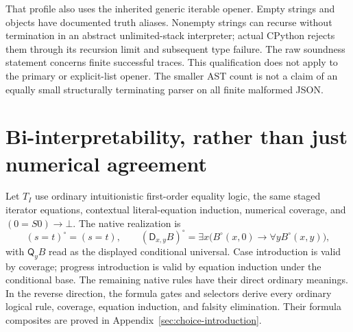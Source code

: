 \documentclass[11pt,letterpaper]{article}
\theoremstyle{definition}\newtheorem{definition}[theorem]{Definition}
\theoremstyle{remark}\newtheorem{remark}[theorem]{Remark}
\newcommand{\D}{\mathsf D}
\newcommand{\Q}{\mathsf Q}
\begin{document}
That profile also uses the inherited generic iterable opener. Empty strings
and objects have documented truth aliases. Nonempty strings can recurse
without termination in an abstract unlimited-stack interpreter; actual
CPython rejects them through its recursion limit and subsequent type failure.
The raw soundness statement concerns finite successful traces. This
qualification does not apply to the primary or explicit-list opener. The
smaller AST count is not a claim of an equally small structurally terminating
parser on all finite malformed JSON.

\section{Bi-interpretability, rather than just numerical agreement}

Let $T_I$ use ordinary intuitionistic first-order equality logic, the same
staged iterator equations, contextual literal-equation induction, numerical
coverage, and $(0=S0)\to\bot$. The native realization is
\[
 (s=t)^\circ=(s=t),\qquad
 (\D_{x,y}B)^\circ=\exists x\bigl(B^\circ(x,0)\to\forall yB^\circ(x,y)\bigr),
\]
with $\Q_yB$ read as the displayed conditional universal. Case introduction
is valid by coverage; progress introduction is valid by equation induction
under the conditional base. The remaining native rules have their direct
ordinary meanings. In the reverse direction, the formula gates and selectors
derive every ordinary logical rule, coverage, equation induction, and falsity
elimination. Their formula composites are proved in
Appendix~\ref{sec:choice-introduction}.
\end{document}
